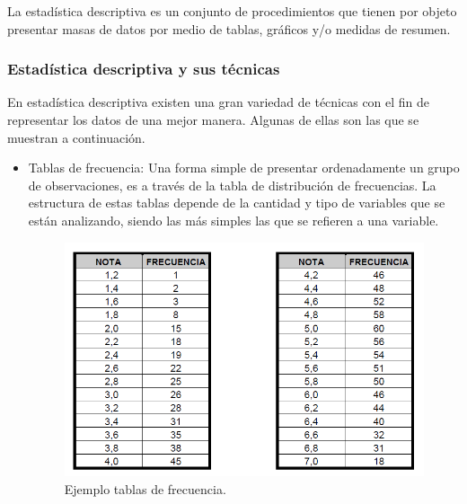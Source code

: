 La estadística descriptiva es un conjunto de procedimientos que tienen por objeto presentar masas de datos por medio de tablas, gráficos y/o medidas de resumen.

\subsubsection{Estadística descriptiva y sus técnicas}

En estadística descriptiva existen una gran variedad de técnicas con el fin de representar los datos de una mejor manera. Algunas de ellas son las que se muestran a continuación.

\clearpage
\newpage

\begin{itemize}

	\item Tablas de frecuencia: Una forma simple de presentar ordenadamente un grupo de observaciones, es a través de la tabla de distribución de frecuencias. La estructura de estas tablas depende de la cantidad y tipo de variables que se están analizando, siendo las más simples las que se refieren a una variable.\\
	
	\begin{figure}[htb]
		\label{Figura4}
		\begin{center}
			\includegraphics[scale=0.4]{imagenes/tablasdefrecuencia.png}
		\end{center}
		\caption{Ejemplo tablas de frecuencia.}
	\end{figure}
	
\end{itemize}


